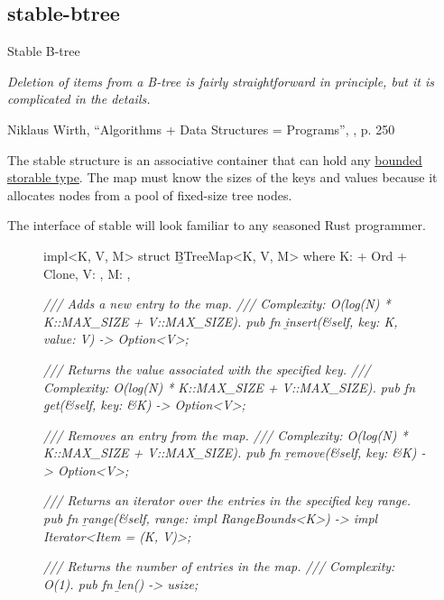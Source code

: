 \documentclass{article}
\begin{document}
\subsection{stable-btree}{Stable B-tree}
\epigraph{
    \em{Deletion} of items from a B-tree is fairly straightforward in principle, but it is complicated in the details.
}{Niklaus Wirth, ``Algorithms + Data Structures = Programs'', , p. 250}

The \href{https://docs.rs/ic-stable-structures/0.4.0/ic_stable_structures/btreemap/struct.BTreeMap.html}{} stable structure is an associative container that can hold any \href{#storable-types}{bounded storable type}.
  The map must know the sizes of the keys and values because it allocates nodes from a pool of fixed-size tree nodes.

The interface of stable  will look familiar to any seasoned Rust programmer.

\begin{figure}
\begin{code}[rust]
impl<K, V, M> struct \b{BTreeMap}<K, V, M>
where
  K: \href{#bounded-storable-trait}{} + Ord + Clone,
  V: \href{#bounded-storable-trait}{},
  M: \href{#memory}{},
{
    \em{/// Adds a new entry to the map.}
    \em{/// Complexity: O(log(N) * K::MAX_SIZE + V::MAX_SIZE).}
    pub fn \b{insert}(&self, key: K, value: V) -> Option<V>;

    \em{/// Returns the value associated with the specified key.}
    \em{/// Complexity: O(log(N) * K::MAX_SIZE + V::MAX_SIZE).}
    pub fn \b{get}(&self, key: &K) -> Option<V>;

    \em{/// Removes an entry from the map.}
    \em{/// Complexity: O(log(N) * K::MAX_SIZE + V::MAX_SIZE).}
    pub fn \b{remove}(&self, key: &K) -> Option<V>;

    \em{/// Returns an iterator over the entries in the specified key range.}
    pub fn \b{range}(&self, range: impl RangeBounds<K>) -> impl Iterator<Item = (K, V)>;

    \em{/// Returns the number of entries in the map.}
    \em{/// Complexity: O(1).}
    pub fn \b{len}() -> usize;
}
\end{code}
\end{figure}
\end{document}
